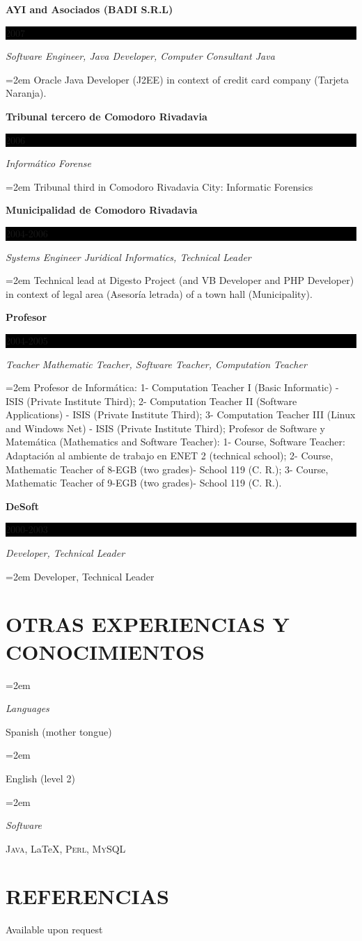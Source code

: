\documentclass[paper=a4,fontsize=11pt]{scrartcl} %
\newlength{\spacebox}
\newcommand{\sepspace}{\vspace*{1em}}		%
\newcommand{\NewPart}[1]{\section*{\uppercase{#1}}}
\newcommand{\PersonalEntry}[2]{
		\noindent\hangindent=2em\hangafter=0 %
		\parbox{\spacebox}{        %
		\textit{#1}}		       %
		\hspace{1.5em} #2 \par}    %
\newcommand{\SkillsEntry}[2]{      %
		\noindent\hangindent=2em\hangafter=0 %
		\parbox{\spacebox}{        %
		\textit{#1}}			   %
		\hspace{1.5em} #2 \par}    %
\newcommand{\EducationEntry}[4]{
		\noindent \textbf{#1} \hfill      %
		\colorbox{Black}{%
			\parbox{6em}{%
			\hfill\color{White}#2}} \par  %
		\noindent \textit{#3} \par        %
		\noindent\hangindent=2em\hangafter=0 \small #4 %
		\normalsize \par}
\begin{document}
\EducationEntry{AYI and Asociados (BADI S.R.L)}{2007}{Software Engineer, Java Developer, Computer Consultant Java}
{Oracle Java Developer (J2EE) in context of credit card company (Tarjeta Naranja).}
\sepspace

\EducationEntry{Tribunal tercero de Comodoro Rivadavia}{2006}{Informático Forense}{
Tribunal third in Comodoro Rivadavia City: Informatic Forensics}
\sepspace

\EducationEntry{Municipalidad de Comodoro Rivadavia}{2004-2006}{Systems Engineer Juridical Informatics, Technical Leader}
{Technical lead at Digesto Project (and VB Developer and PHP Developer) in context of legal area (Asesoría letrada) of a town hall (Municipality).}
\sepspace

\EducationEntry{Profesor}{2004-2005}{Teacher Mathematic Teacher, Software Teacher, Computation Teacher}
{Profesor de Informática: 1- Computation Teacher I (Basic Informatic) - ISIS (Private Institute Third); 2- Computation Teacher II (Software Applications) - ISIS (Private Institute Third); 3- Computation Teacher III (Linux and Windows Net) - ISIS (Private Institute Third); Profesor de Software y Matemática (Mathematics and Software Teacher): 1- Course, Software Teacher: Adaptación al ambiente de trabajo en ENET 2 (technical school); 2- Course, Mathematic Teacher of 8-EGB  (two grades)- School 119 (C. R.); 3- Course, Mathematic Teacher of 9-EGB (two grades)- School 119 (C. R.).
}
\sepspace

\EducationEntry{DeSoft}{2000-2003}{Developer, Technical Leader}{
Developer, Technical Leader}
\sepspace

\NewPart{Otras Experiencias y Conocimientos}{}

\SkillsEntry{Languages}{Spanish (mother tongue)}
\SkillsEntry{}{English (level 2)}


\SkillsEntry{Software}{
\textsc{Java}, \LaTeX, \textsc{Perl}, \textsc{MySQL}
}


\NewPart{Referencias}{}
Available upon request
\end{document}
